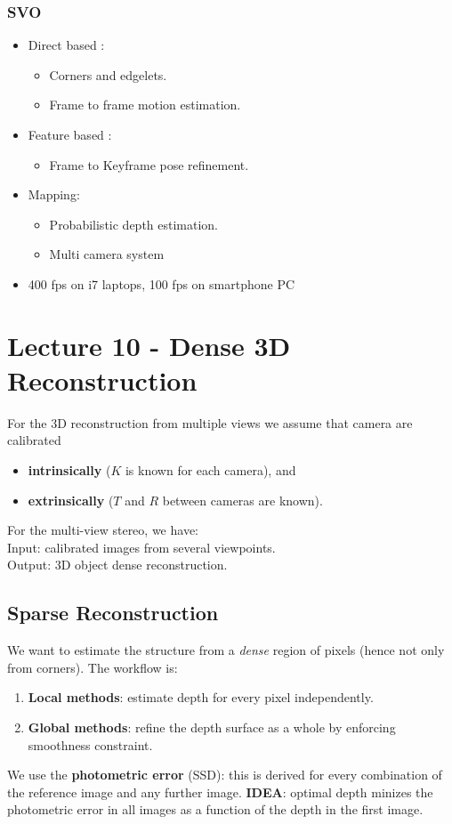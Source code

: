 \documentclass[a4paper,12 pt]{article}
\theoremstyle{definition}
\theoremstyle{remark}
\theoremstyle{definition}
\theoremstyle{definition}
\theoremstyle{definition}
\theoremstyle{remark}
\theoremstyle{definition}
\begin{document}
\subsubsection*{SVO}
\begin{itemize}
\item Direct based :
\begin{itemize}
\item Corners and edgelets.
\item Frame to frame motion estimation.
\end{itemize}
\item Feature based :
\begin{itemize}
\item Frame to Keyframe pose refinement.
\end{itemize}
\item Mapping:
\begin{itemize}
\item Probabilistic depth estimation.
\item Multi camera system
\end{itemize}
\item 400 fps on i7 laptops, 100 fps on smartphone PC
\end{itemize}
\newpage
\section*{Lecture 10 - Dense 3D Reconstruction}
For the 3D reconstruction from multiple views we assume that camera are calibrated
\begin{itemize}
\item \textbf{intrinsically} ($K$ is known for each camera), and
\item \textbf{extrinsically} ($T$ and $R$ between cameras are known).
\end{itemize}
For the multi-view stereo, we have:\\
Input: calibrated images from several viewpoints. \\
Output: 3D object dense reconstruction. 
\subsection*{Sparse Reconstruction}
We want to estimate the structure from a \textit{dense} region of pixels (hence not only from corners). The workflow is:
\begin{enumerate}
\item \textbf{Local methods}: estimate depth for every pixel independently.
\item \textbf{Global methods}: refine the depth surface as a whole by enforcing smoothness constraint.
\end{enumerate}
We use the \textbf{photometric error} (SSD): this is derived for every combination of the reference image and any further image. \textbf{IDEA}: optimal depth minizes the photometric error in all images as a function of the depth in the first image.
\end{document}
